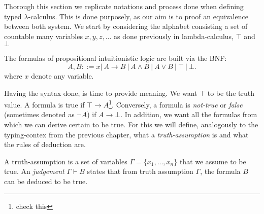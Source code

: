 Thorough this section we replicate notations and process done when defining typed $\lambda$-calculus. This is done purposely, as our aim is to proof an equivalence between both system. We start by considering the alphabet consisting a set of countable many variables $x,y,z,...$ as done previously in lambda-calculus, $\top$ and $\bot$ 

\begin{definition}
  The formulas of propositional intuitionistic logic are built via the BNF:
  $$A,B ::= x |\ A\to B\ |\ A \land B \ |\ A \lor B \ |\ \top \ |\ \bot .$$
  where $x$ denote any variable.
\end{definition}




Having the syntax done, is time to provide meaning. We want $\top$ to be the truth value. A formula is true if $\top \to A$\footnote{check this}. Conversely, a formula is \emph{not-true} or \emph{false} (sometimes denoted as $\neg A$) if $ A \to \bot$. In addition, we want all the formulas from which we can derive certain to be true. For this we will define, analogously to the typing-contex from the previous chapter, what a \emph{truth-assumption} is and  what the rules of deduction are.

\begin{definition}
 A truth-assumption is a set of variables $\Gamma = \{x_1,...,x_n\}$ that we assume to be true. An \emph{judgement} $\Gamma \vdash B$ states that from truth assumption $\Gamma$, the formula $B$ can be deduced to be true. 
\end{definition}

